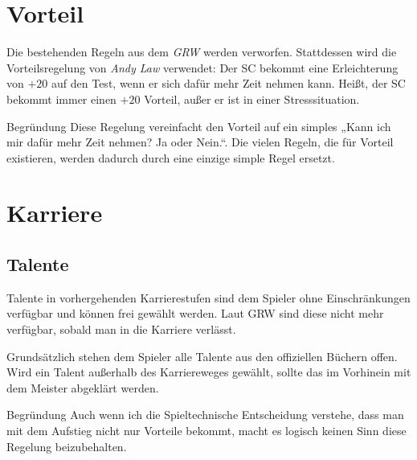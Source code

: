 \documentclass[a4paper,10pt,twoside,twocolumn,openany,nodeprecatedcode,bg=print]{dndbook}
\begin{document}

\section{Vorteil}
Die bestehenden Regeln aus dem \textit{GRW} werden verworfen.
Stattdessen wird die Vorteilsregelung von \textit{Andy Law} verwendet: Der SC bekommt eine Erleichterung von $+20$ auf den Test, wenn er sich dafür mehr Zeit nehmen kann. Heißt, der SC bekommt immer einen $+20$ Vorteil, außer er ist in einer Stresssituation.

\begin{DndComment}{Begründung}
  Diese Regelung vereinfacht den Vorteil auf ein simples „Kann ich mir dafür mehr Zeit nehmen? Ja oder Nein.“. Die vielen Regeln, die für Vorteil existieren, werden dadurch durch eine einzige simple Regel ersetzt.
\end{DndComment}


\vspace{\fill}
\pagebreak

\section{Karriere}
\subsection{Talente}
Talente in vorhergehenden Karrierestufen sind dem Spieler ohne Einschränkungen verfügbar und können frei gewählt werden.
Laut GRW sind diese nicht mehr verfügbar, sobald man in die Karriere verlässt.

Grundsätzlich stehen dem Spieler alle Talente aus den offiziellen Büchern offen.
Wird ein Talent außerhalb des Karriereweges gewählt, sollte das im Vorhinein mit dem Meister abgeklärt werden.

\begin{DndComment}{Begründung}
  Auch wenn ich die Spieltechnische Entscheidung verstehe, dass man mit dem Aufstieg nicht nur Vorteile bekommt, macht es logisch keinen Sinn diese Regelung beizubehalten.
\end{DndComment}
\end{document}
